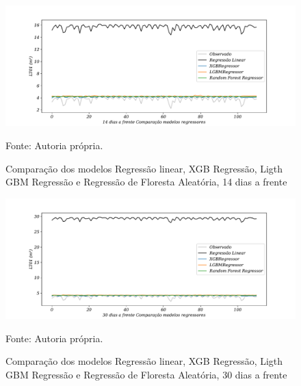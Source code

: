 \begin{figure}[H]
	\centering
	\caption{Comparação dos modelos Regressão linear, XGB Regressão, Ligth GBM Regressão e Regressão de Floresta Aleatória, 14 dias a frente }
	\label{fig:30-LR-XGB-LGBM-RF24}
	\includegraphics[width=1\linewidth]{Apendices/Figuras/modelagem-24h/14-LR-XGB-LGBM-RF}
	
	Fonte: Autoria própria.
\end{figure}

\begin{figure}[H]
	\centering
	\caption{Comparação dos modelos Regressão linear, XGB Regressão, Ligth GBM Regressão e Regressão de Floresta Aleatória, 30 dias a frente }
	\label{fig:60-LR-XGB-LGBM-RF24}
	\includegraphics[width=1\linewidth]{Apendices/Figuras/modelagem-24h/30-LR-XGB-LGBM-RF}
	
	Fonte: Autoria própria.
\end{figure}